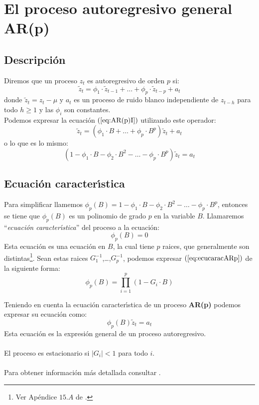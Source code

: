 %
%

\section{El proceso autoregresivo general AR(p)}

\subsection{Descripci\'on}

Diremos que un proceso $z_t$ es autoregresivo de orden $p$ si:
\begin{equation}\label{eq:AR(p)I}
\widetilde{z}_t = \phi_1\cdot \widetilde{z}_{t-1}+\dots+\phi_p\cdot
\widetilde{z}_{t-p}+a_t
\end{equation}
donde $\widetilde{z}_t=z_t-\mu$ y $a_t$ es un proceso de ruido blanco
independiente de $z_{t-h}$ para todo $h\ge 1$ y las $\phi_i$ son constantes.\\

Podemos expresar la ecuaci\'on $(\ref{eq:AR(p)I})$ utilizando este operador:
\begin{displaymath}
\widetilde{z}_t=(\phi_1\cdot B+\dots +\phi_p\cdot B^p)\widetilde{z}_t +a_t
\end{displaymath}
o lo que es lo mismo:
\begin{displaymath}
(1-\phi_1\cdot B - \phi_2\cdot B^2-\dots - \phi_p\cdot B^p)\widetilde{z}_t
= a_t
\end{displaymath}

\subsection{Ecuaci\'on caracter\'{\i}stica}

Para simplificar llamemos
$\phi_p(B)= 1-\phi_1\cdot B-\phi_2\cdot B^2-\dots -\phi_p\cdot B^p$, entonces
se tiene que $\phi_p(B)$ es un polinomio de grado $p$ en la variable $B$. 
Llamaremos ``\emph{ecuaci\'on caracter\'{\i}stica}'' del proceso a la
ecuaci\'on:
\begin{equation}\label{eq:ecucaracARp}
\phi_p(B) = 0
\end{equation}
Esta ecuaci\'on es una ecuaci\'on en $B$, la cual tiene $p$ raices, que
generalmente son distintas\footnote{Ver Ap\'endice $15.A$ de \cite{Daniel}.}.
Sean estas raices $G_1^{-1}$,\dots,$G_p^{-1}$, podemos expresar
$(\ref{eq:ecucaracARp})$ de la siguiente forma:
\begin{equation}
\phi_p(B)= \prod_{i=1}^p (1-G_i\cdot B) 
\end{equation}

Teniendo en cuenta la ecuaci\'on caracter\'{\i}stica de un proceso
\textbf{AR(p)} podemos expresar su ecuaci\'on como:
\begin{equation}\label{eq:AR(p)II}
\phi_p(B)\widetilde{z}_t = a_t
\end{equation}
Esta ecuaci\'on es la expresi\'on general de un proceso autoregresivo.\\ \\
%
El proceso es estacionario si $|G_i|<1$ para todo $i$.\\ \\
%
Para obtener informaci\'on m\'as detallada consultar \cite{Daniel}.

